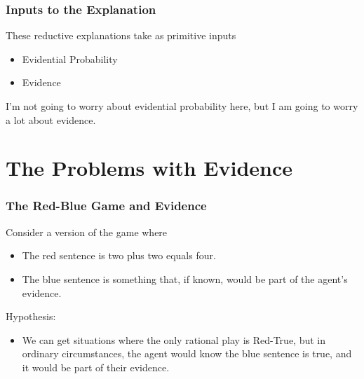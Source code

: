 \begin{frame}

\frametitle{Inputs to the Explanation}
\label{inputstotheexplanation}

These reductive explanations take as primitive inputs

\begin{itemize}
\item Evidential Probability

\item Evidence

\end{itemize}
I'm not going to worry about evidential probability here, but I am going to worry a lot about evidence.

\end{frame}

\section{The Problems with Evidence}
\label{theproblemswithevidence}

\begin{frame}

\frametitle{The Red-Blue Game and Evidence}
\label{thered-bluegameandevidence}

Consider a version of the game where

\begin{itemize}
\item The red sentence is two plus two equals four.

\item The blue sentence is something that, if known, would be part of the agent's evidence.

\end{itemize}
Hypothesis:

\begin{itemize}
\item We can get situations where the only rational play is Red-True, but in ordinary circumstances, the agent would know the blue sentence is true, and it would be part of their evidence.

\end{itemize}
\end{frame}

